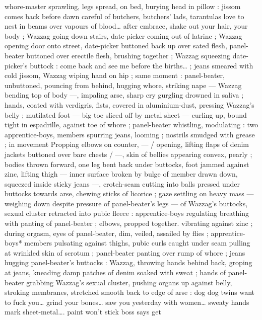 whore-master sprawling, legs spread, on bed, burying head in pillow 
: {\gl} {\td} jissom comes back before dawn{\td} careful of butchers, butchers' 
lads, tarantulas love to nest in beams over vapours of blood{\ldots} after 
embrace, shake out your hair, your body{\td} {\gr} ; Wazzag going down 
stairs, date-picker coming out of latrine ; Wazzag opening door onto 
street, date-picker buttoned back up over sated flesh, panel-beater 
buttoned over erectile flesh, brushing together ; Wazzag squeezing 
date-picker's buttock : {\gl} {\td} come back and see me before the births{\ldots} 
{\gr} ; jeans smeared with cold jissom, Wazzag wiping hand on hip ; same 
moment : panel-beater, unbuttoned, pouncing from behind, hugging 
whore, striking nape --- Wazzag bending top of body ---, impaling 
arse, sharp cry gurgling drowned in saliva ; hands, coated with 
verdigris, fists, covered in aluminium-dust, pressing Wazzag's belly ; 
mutilated foot --- big toe sliced off by metal sheet --- curling up, 
bound tight in espadrille, against toe of whore ; panel-beater 
whistling, modulating : two apprentice-boys, members spurring 
jeans, looming ; nostrils smudged with grease ; in movement 
Propping elbows on counter, --- {\slash} opening, lifting flaps of denim 
jackets buttoned over bare chests {\slash} ---, skin of bellies appearing 
convex, pearly ; bodies thrown forward, one leg bent back under 
buttocks, foot jammed against zinc, lifting thigh --- inner surface 
broken by bulge of member drawn down, squeezed inside sticky 
jeans ---, crotch-seam cutting into balls pressed under buttocks 
towards arse, chewing sticks of licorice ; gaze settling on heavy mass 
--- weighing down despite pressure of panel-beater's legs --- of 
Wazzag's buttocks, sexual cluster retracted into pubic fleece : 
apprentice-boys regulating breathing with panting of panel-beater ; 
elbows, propped together. vibrating against zinc ; during orgasm, 
eyes of panel-beater, dim, veiled, assailed by flies ; apprentice-boys* 
members pulsating against thighs, pubic curls caught under seam 
pulling at wrinkled skin of scrotum ; panel-beater panting over rump 
of whore ; jeans hugging panel-beater's buttocks : Wazzag, throwing 
hands behind back, groping at jeans, kneading damp patches of 
denim soaked with sweat ; hands of panel-beater grabbing Wazzag's 
sexual cluster, pushing organs up against belly, stroking membranes, 
stretched smooth back to edge of arse : {\td} {\gl} {\td} dog{\td} dog{\td} twins want 
to fuck you{\ldots} grind your bones{\ldots} saw you yesterday with women{\ldots} 
sweaty hands mark sheet-metal{\ldots}. paint won't stick{\td} boss says {\gl} get 
